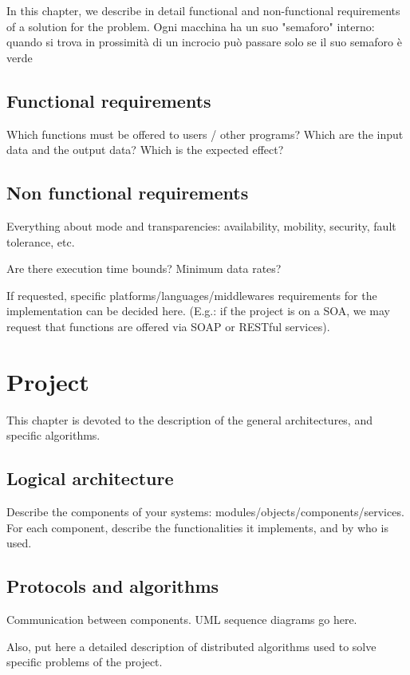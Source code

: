 \documentclass{memoir}
\begin{document}
In this chapter, we describe in detail functional and non-functional
requirements of a solution for the problem. Ogni macchina ha un suo "semaforo"
interno: quando si trova in prossimità di un incrocio può passare solo se il suo
semaforo è verde

\section{Functional requirements}
Which functions must be offered to users / other programs?  Which are the input data and the output data? Which is the expected effect? 

\section{Non functional requirements}
Everything about mode and transparencies: availability, mobility, security, fault tolerance, etc.

Are there execution time bounds? Minimum data rates?

If requested, specific platforms/languages/middlewares requirements for the implementation can be decided here. (E.g.: if the project is on a SOA, we may request that functions are offered via SOAP or RESTful services). 



\chapter{Project}

This chapter is devoted to the description of the general architectures, and specific algorithms.

\section{Logical architecture}
Describe the components of your systems: modules/objects/components/services.
For each component, describe the functionalities it implements, and by who is used.

\section{Protocols and algorithms}
Communication between components.  UML sequence diagrams go here.

Also, put here a detailed description of distributed algorithms used to solve specific problems of the project.
\end{document}
